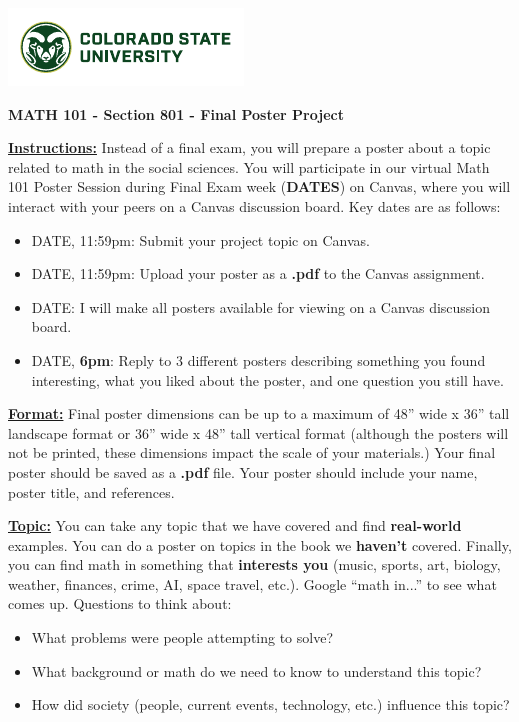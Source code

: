 \documentclass[12pt]{article}
\begin{document}
\includegraphics{CSUSig}

\begin{center}
    {\large\textbf{MATH 101 - Section 801 - Final Poster Project}}
\end{center}
\textbf{\underline{Instructions:}} Instead of a final exam, you will prepare a poster about a topic related to math in the social sciences. You will participate in our virtual Math 101 Poster Session during Final Exam week (\textbf{DATES}) on Canvas, where you will interact with your peers on a Canvas discussion board. Key dates are as follows:

\begin{itemize}
    \item DATE, 11:59pm: Submit your project topic on Canvas.
    \item DATE, 11:59pm: Upload your poster as a \textbf{.pdf} to the Canvas assignment.
    \item DATE: I will make all posters available for viewing on a Canvas discussion board.
    \item DATE, \textbf{6pm}: Reply to 3 different posters describing something you found interesting, what you liked about the poster, and one question you still have.
\end{itemize}

\textbf{\underline{Format:}} Final poster dimensions can be up to a maximum of 48'' wide x 36'' tall landscape format or 36'' wide x 48'' tall vertical format (although the posters will not be printed, these dimensions impact the scale of your materials.) Your final poster should be saved as a \textbf{.pdf} file. Your poster should include your name, poster title, and references.

\textbf{\underline{Topic:}}
You can take any topic that we have covered and find \textbf{real-world} examples. You can do a poster on topics in the book we \textbf{haven't} covered. Finally, you can find math in something that \textbf{interests you} (music, sports, art, biology, weather, finances, crime, AI, space travel, etc.). Google ``math in...'' to see what comes up. Questions to think about:
\begin{itemize}
    \item What problems were people attempting to solve?
    \item What background or math do we need to know to understand this topic?
    \item How did society (people, current events, technology, etc.) influence this topic?
\end{itemize}
\end{document}
